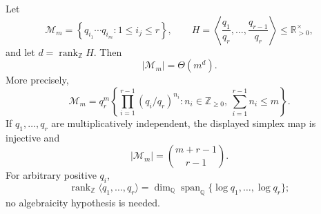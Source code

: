 \begin{theorem}
\label{thm:cueM-multiplier-rank}
Let
\begin{equation}
 \mathcal M_m=\left\{q_{i_1}\cdots q_{i_m}:1\leq i_j\leq r\right\},
 \qquad
 H=\left\langle\frac{q_1}{q_r},\ldots,\frac{q_{r-1}}{q_r}\right\rangle
 \leq\mathbb R_{>0}^{\times},
 \label{eq:cueM-multiplier-set}
\end{equation}
and let $d=\operatorname{rank}_{\mathbb Z}H$.  Then
\begin{equation}
 |\mathcal M_m|=\Theta(m^d).
 \label{eq:cueM-multiplier-growth}
\end{equation}
More precisely,
\begin{equation}
 \mathcal M_m=q_r^m\left\{
 \prod_{i=1}^{r-1}(q_i/q_r)^{n_i}:
 n_i\in\mathbb Z_{\geq0},\ \sum_{i=1}^{r-1}n_i\leq m
 \right\}.
 \label{eq:cueM-multiplier-simplex-map}
\end{equation}
If $q_1,\ldots,q_r$ are multiplicatively independent, the displayed simplex map is
injective and
\begin{equation}
 |\mathcal M_m|=\binom{m+r-1}{r-1}.
 \label{eq:cueM-multiplier-independent}
\end{equation}
For arbitrary positive $q_i$,
\begin{equation}
 \operatorname{rank}_{\mathbb Z}\langle q_1,\ldots,q_r\rangle
 =\dim_{\mathbb Q}\operatorname{span}_{\mathbb Q}
 \{\log q_1,\ldots,\log q_r\};
 \label{eq:cueM-log-rank}
\end{equation}
no algebraicity hypothesis is needed.
\end{theorem}

